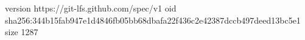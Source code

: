 version https://git-lfs.github.com/spec/v1
oid sha256:344b15fab947e1d4846fb05bb68dbafa22f436c2e42387dccb497deed13bc5e1
size 1287
